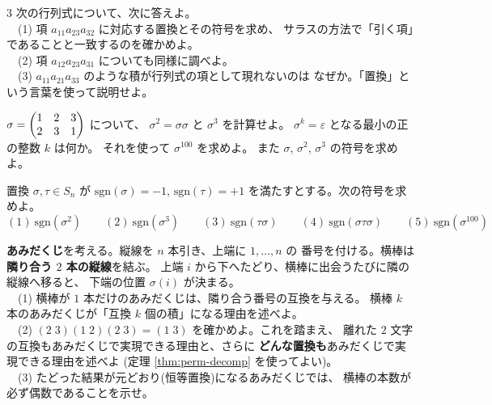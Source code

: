 \begin{mondai}[標準]\label{q:perm-ex6}
$3$ 次の行列式について、次に答えよ。\\
　(1) 項 $a_{11}a_{23}a_{32}$ に対応する置換とその符号を求め、
サラスの方法で「引く項」であることと一致するのを確かめよ。\\
　(2) 項 $a_{12}a_{23}a_{31}$ についても同様に調べよ。\\
　(3) $a_{11}a_{21}a_{33}$ のような積が行列式の項として現れないのは
なぜか。「置換」という言葉を使って説明せよ。
\end{mondai}

\begin{mondai}[標準]\label{q:perm-ex7}
$\sigma = \begin{pmatrix}1 & 2 & 3 \\ 2 & 3 & 1\end{pmatrix}$ について、
$\sigma^2 = \sigma\sigma$ と $\sigma^3$ を計算せよ。
$\sigma^k = \varepsilon$ となる最小の正の整数 $k$ は何か。
それを使って $\sigma^{100}$ を求めよ。
また $\sigma$, $\sigma^2$, $\sigma^3$ の符号を求めよ。
\end{mondai}

\begin{mondai}[標準]\label{q:perm-ex8}
置換 $\sigma, \tau \in S_n$ が $\mathrm{sgn}(\sigma) = -1$,
$\mathrm{sgn}(\tau) = +1$ を満たすとする。次の符号を求めよ。
\[
(1)\ \mathrm{sgn}(\sigma^2) \qquad
(2)\ \mathrm{sgn}(\sigma^3) \qquad
(3)\ \mathrm{sgn}(\tau\sigma) \qquad
(4)\ \mathrm{sgn}(\sigma\tau\sigma) \qquad
(5)\ \mathrm{sgn}(\sigma^{100})
\]
\end{mondai}

\begin{mondai}[発展]\label{q:perm-ex9}
\textbf{あみだくじ}を考える。縦線を $n$ 本引き、上端に $1, \dots, n$ の
番号を付ける。横棒は\textbf{隣り合う $2$ 本の縦線}を結ぶ。
上端 $i$ から下へたどり、横棒に出会うたびに隣の縦線へ移ると、
下端の位置 $\sigma(i)$ が決まる。\\
　(1) 横棒が $1$ 本だけのあみだくじは、隣り合う番号の互換を与える。
横棒 $k$ 本のあみだくじが「互換 $k$ 個の積」になる理由を述べよ。\\
　(2) $(2\;3)(1\;2)(2\;3) = (1\;3)$ を確かめよ。これを踏まえ、
離れた $2$ 文字の互換もあみだくじで実現できる理由と、さらに
\textbf{どんな置換も}あみだくじで実現できる理由を述べよ
(定理 \ref{thm:perm-decomp} を使ってよい)。\\
　(3) たどった結果が元どおり(恒等置換)になるあみだくじでは、
横棒の本数が必ず偶数であることを示せ。
\end{mondai}

